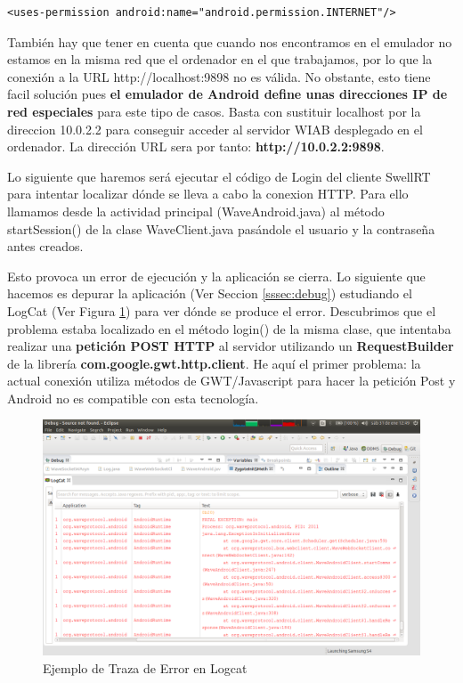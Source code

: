 	  \lstset{language=XML, breaklines=true, autogobble=true, basicstyle=\ttfamily\footnotesize}
	  \begin{lstlisting}[frame=single]
	  	<uses-permission android:name="android.permission.INTERNET"/>
	  \end{lstlisting}
	  
	  	 También hay que tener en cuenta que cuando nos encontramos en el emulador no estamos en la misma red que el ordenador en el que trabajamos, por lo que la conexión a la URL http://localhost:9898 no es válida. No obstante, esto tiene facil solución pues \textbf{el emulador de Android define unas direcciones IP de red especiales} \cite{ref:android_netAddress} para este tipo de casos. Basta con sustituir localhost por la direccion 10.0.2.2 para conseguir acceder al servidor WIAB desplegado en el ordenador. La dirección URL sera por tanto: \textbf{http://10.0.2.2:9898}. 
	  
	 Lo siguiente que haremos será ejecutar el código de Login del cliente SwellRT para intentar localizar dónde se lleva a cabo la conexion HTTP. Para ello llamamos desde la actividad principal (WaveAndroid.java) al método startSession() de la clase WaveClient.java pasándole el usuario y la contraseña antes creados.
 
	 Esto provoca un error de ejecución y la aplicación se cierra. Lo siguiente que hacemos es depurar la aplicación (Ver Seccion \ref{sssec:debug}) estudiando el LogCat \cite{ref:android_logcat} (Ver Figura \ref{fig:android_logcat}) para ver dónde se produce el error. Descubrimos que el problema estaba localizado en el método login() de la misma clase, que intentaba realizar una \textbf{petición POST HTTP} al servidor utilizando un \textbf{RequestBuilder} de la librería \textbf{com.google.gwt.http.client}. He aquí el primer problema: la actual conexión utiliza métodos de GWT/Javascript para hacer la petición Post y Android no es compatible con esta tecnología.   
	 
	\begin{figure}[H]
      \centering
	\includegraphics[keepaspectratio, scale=0.3]{Media/Captures/logcat_example.png}
      \caption{Ejemplo de Traza de Error en Logcat}
      \label{fig:android_logcat}
    \end{figure} 
	 

